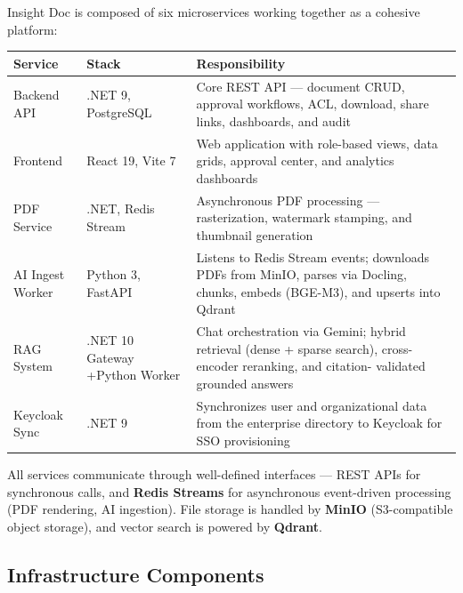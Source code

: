 Insight Doc is composed of six microservices working together
as a cohesive platform:

\begin{tabularx}{\textwidth}{@{} l l X @{}}
  \toprule
  \textbf{Service} & \textbf{Stack} & \textbf{Responsibility} \\
  \midrule
  Backend API
    & .NET 9, PostgreSQL
    & Core REST API --- document CRUD, approval workflows, ACL,
      download, share links, dashboards, and audit \\
  Frontend
    & React 19, Vite 7
    & Web application with role-based views, data grids,
      approval center, and analytics dashboards \\
  PDF Service
    & .NET, Redis Stream
    & Asynchronous PDF processing --- rasterization, watermark
      stamping, and thumbnail generation \\
  AI Ingest Worker
    & Python 3, FastAPI
    & Listens to Redis Stream events; downloads PDFs from MinIO,
      parses via Docling, chunks, embeds (BGE-M3), and upserts
      into Qdrant \\
  RAG System
    & .NET 10 Gateway +\newline Python Worker
    & Chat orchestration via Gemini; hybrid retrieval (dense +
      sparse search), cross-encoder reranking, and citation-
      validated grounded answers \\
  Keycloak Sync
    & .NET 9
    & Synchronizes user and organizational data from the
      enterprise directory to Keycloak for SSO provisioning \\
  \bottomrule
\end{tabularx}

\begin{ugNote}
  All services communicate through well-defined interfaces ---
  REST APIs for synchronous calls, and \textbf{Redis Streams} for
  asynchronous event-driven processing (PDF rendering, AI
  ingestion). File storage is handled by \textbf{MinIO}
  (S3-compatible object storage), and vector search is powered
  by \textbf{Qdrant}.
\end{ugNote}

\subsection{Infrastructure Components}

